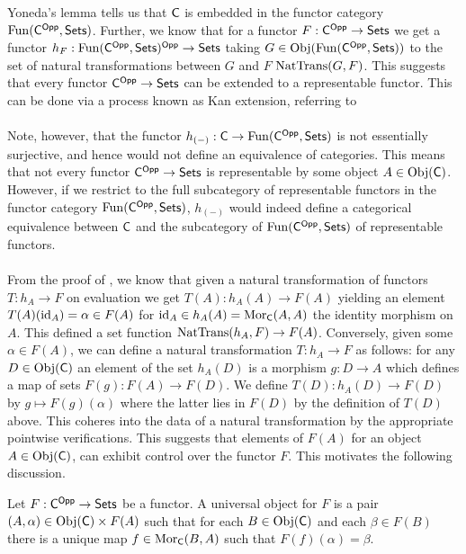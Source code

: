 Yoneda's lemma tells us that $\mathsf{C}$ is embedded in the functor category $\mathrm{Fun}(\mathsf{C}^{\mathsf{Opp}},\mathsf{Sets})$. Further, we know that for a functor $F:\mathsf{C}^{\mathsf{Opp}}\to\mathsf{Sets}$ we get a functor $h_{F}:\mathrm{Fun}(\mathsf{C}^{\mathsf{Opp}},\mathsf{Sets})^{\mathsf{Opp}}\to\mathsf{Sets}$ taking $G\in\mathrm{Obj}(\mathrm{Fun}(\mathsf{C}^{\mathsf{Opp}},\mathsf{Sets}))$ to the set of natural transformations between $G$ and $F$ $\mathrm{NatTrans}(G,F)$. This suggests that every functor $\mathsf{C}^{\mathsf{Opp}}\to\mathsf{Sets}$ can be extended to a representable functor. This can be done via a process known as Kan extension, referring to 
\\\\
Note, however, that the functor $h_{(-)}:\mathsf{C}\to\mathrm{Fun}(\mathsf{C}^{\mathsf{Opp}},\mathsf{Sets})$ is not essentially surjective, and hence would not define an equivalence of categories. This means that not every functor $\mathsf{C}^{\mathsf{Opp}}\to\mathsf{Sets}$ is representable by some object $A\in\mathrm{Obj}(\mathsf{C})$. However, if we restrict to the full subcategory of representable functors in the functor category $\mathrm{Fun}(\mathsf{C}^{\mathsf{Opp}},\mathsf{Sets})$, $h_{(-)}$ would indeed define a categorical equivalence between $\mathsf{C}$ and the subcategory of $\mathrm{Fun}(\mathsf{C}^{\mathsf{Opp}},\mathsf{Sets})$ of representable functors. 
\\\\
From the proof of , we know that given a natural transformation of functors $T:h_{A}\to F$ on evaluation we get $T(A):h_{A}(A)\to F(A)$ yielding an element $T(A)(\mathrm{id}_{A})=\alpha\in F(A)$ for $\mathrm{id}_{A}\in h_{A}(A)=\mathrm{Mor}_{\mathsf{C}}(A,A)$ the identity morphism on $A$. This defined a set function $\mathrm{NatTrans}(h_{A},F)\to F(A)$. Conversely, given some $\alpha\in F(A)$, we can define a natural transformation $T:h_{A}\longrightarrow F$ as follows: for any $D\in\mathrm{Obj}(\mathsf{C})$ an element of the set $h_{A}(D)$ is a morphism $g:D\to A$ which defines a map of sets $F(g):F(A)\to F(D)$. We define $T(D):h_{A}(D)\to F(D)$ by $g\mapsto F(g)(\alpha)$ where the latter lies in $F(D)$ by the definition of $T(D)$ above. This coheres into the data of a natural transformation by the appropriate pointwise verifications. This suggests that elements of $F(A)$ for an object $A\in\mathrm{Obj}(\mathsf{C})$, can exhibit control over the functor $F$. This motivates the following discussion. 
\begin{definition}\label{def: universal object}
    Let $F:\mathsf{C}^{\mathsf{Opp}}\to\mathsf{Sets}$ be a functor. A universal object for $F$ is a pair $(A,\alpha)\in\mathrm{Obj}(\mathsf{C})\times F(A)$ such that for each $B\in\mathrm{Obj}(\mathsf{C})$ and each $\beta\in F(B)$ there is a unique map $f\in\mathrm{Mor}_{\mathsf{C}}(B,A)$ such that $F(f)(\alpha)=\beta$. 
\end{definition}
